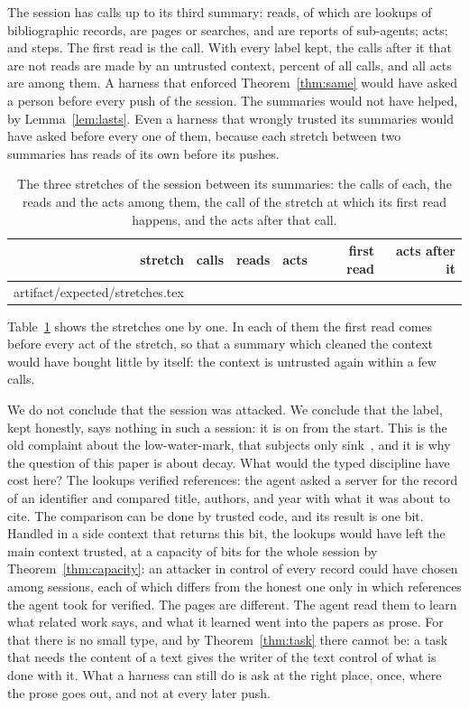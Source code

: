\documentclass[acmsmall,nonacm,screen]{acmart}
\makeatletter
\newcommand{\claim}[2]{#2}
\newcommand{\rows}[1]{\@@input artifact/expected/#1.tex }
\makeatother
\begin{document}
\claim{session}{The session has \exSessionCalls{} calls up to its third summary:
\exSessionReads{} reads, of which \exSessionLookups{} are lookups of bibliographic records,
\exSessionPages{} are pages or searches, and \exSessionAgents{} are reports of sub-agents;
\exSessionActs{} acts; and steps. The first read is the \exSessionFirst{} call. With every
label kept, the \exSessionAfter{} calls after it that are not reads are made by an untrusted
context, \exSessionShare{} percent of all calls, and all \exSessionActs{} acts are among
them.} A harness that enforced Theorem~\ref{thm:same} would have asked a person before every
push of the session. The \exSessionSummaries{} summaries would not have helped, by
Lemma~\ref{lem:lasts}. Even a harness that wrongly trusted its summaries would have asked
before every one of them, because each stretch between two summaries has reads of its own
before its pushes.

\begin{table}
\caption{The three stretches of the session between its summaries: the calls of each, the
reads and the acts among them, the call of the stretch at which its first read happens, and
the acts after that call.}
\label{tab:stretches}
\begin{tabular}{rrrrrr}
\toprule
stretch & calls & reads & acts & first read & acts after it \\
\midrule
\rows{stretches}
\bottomrule
\end{tabular}
\end{table}

\claim{stretches}{Table~\ref{tab:stretches} shows the stretches one by one.} In each of them
the first read comes before every act of the stretch, so that a summary which cleaned the
context would have bought little by itself: the context is untrusted again within a few
calls.

We do not conclude that the session was attacked. We conclude that the label, kept honestly,
says nothing in such a session: it is on from the start. This is the old complaint about the
low-water-mark, that subjects only sink~\cite{fraser2000}, and it is why the question of
this paper is about decay. What would the typed discipline have cost here? The
\exSessionLookups{} lookups verified references: the agent asked a server for the record of
an identifier and compared title, authors, and year with what it was about to cite. The
comparison can be done by trusted code, and its result is one bit. Handled in a side context
that returns this bit, the lookups would have left the main context trusted, at a capacity
of \exSessionLookups{} bits for the whole session by Theorem~\ref{thm:capacity}: an attacker
in control of every record could have chosen among \exLookupFutures{} sessions, each of
which differs from the honest one only in which references the agent took for verified. The pages
are different. The agent read them to learn what related work says, and what it learned
went into the papers as prose. For that there is no small type, and by
Theorem~\ref{thm:task} there cannot be: a task that needs the content of a text gives the
writer of the text control of what is done with it. What a harness can still do is ask at
the right place, once, where the prose goes out, and not at every later push.
\end{document}
